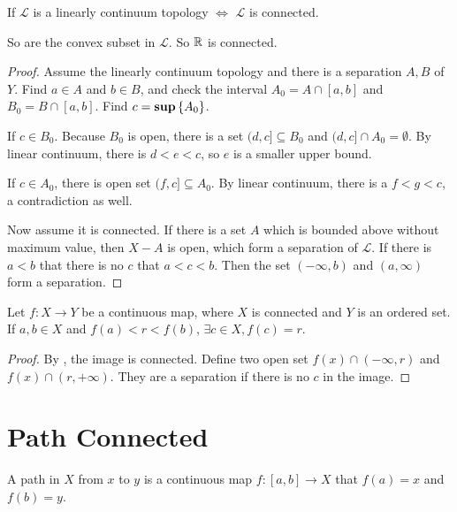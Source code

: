 \begin{theorem}
    If $\mathcal{L}$ is a linearly continuum topology $\Leftrightarrow$ $\mathcal{L}$ is connected. 
    
    So are the convex subset in $\mathcal{L}$. So $\mathbb{R}$ is connected.
\end{theorem}
\begin{proof}
    Assume the linearly continuum topology and there is a separation $A,B$ of $Y$. Find $a \in A$ and $b \in B$, and check the interval $A_0 = A \cap [a,b]$ and $B_0 = B \cap [a,b]$. Find $c = \mathbf{sup} \set{A_0}$. 
    
    If $c \in B_0$. Because $B_0$ is open, there is a set $(d,c] \subseteq B_0$ and $(d,c] \cap A_0 = \emptyset$. By linear continuum, there is $d < e < c$, so $e$ is a smaller upper bound.
    
    If $c \in A_0$, there is open set $(f,c] \subseteq A_0$. By linear continuum, there is a $f < g < c$, a contradiction as well.
    
    Now assume it is connected. If there is a set $A$ which is bounded above without maximum value, then $X - A$ is open, which form a separation of $\mathcal{L}$. If there is $a < b$ that there is no $c$ that $a < c < b$. Then the set $(-\infty, b)$ and $(a, \infty)$ form a separation.
\end{proof}


\begin{theorem}
    Let $f : X \rightarrow Y$ be a continuous map, where $X$ is connected and $Y$ is an ordered set. If $a,b \in X$ and $f(a) < r < f(b)$, $\exists c \in X, f(c) = r$.
\end{theorem}
\begin{proof}
    By , the image is connected. Define two open set $f(x) \cap (-\infty, r)$ and $f(x) \cap (r, +\infty)$. They are a separation if there is no $c$ in the image.
\end{proof}



\section{Path Connected}

\begin{definition}
    A path in $X$ from $x$ to $y$ is a continuous map $f: [a,b] \rightarrow X$ that $f(a) = x$ and $f(b) = y$. 
\end{definition}

